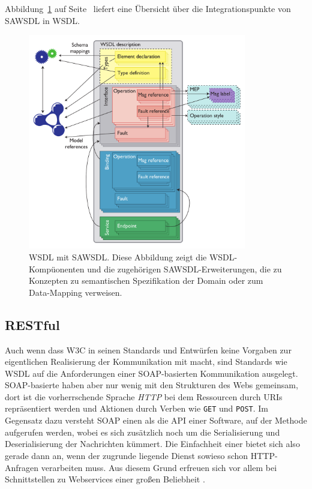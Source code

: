 Abbildung~\ref{f:sawsdl} auf Seite~\pageref{f:sawsdl} liefert eine Übersicht über die Integrationspunkte von \ac{SAWSDL} in \ac{WSDL}.

\begin{figure}[ht]
\centering
\parbox{0.85\textwidth}{
    \includegraphics[width=0.85\textwidth]{media/sawsdl.png}
    \caption{\ac{WSDL} mit \ac{SAWSDL}. Diese Abbildung zeigt die \ac{WSDL}-Kompüonenten und die zugehörigen \ac{SAWSDL}-Erweiterungen, die zu Konzepten zu semantischen Spezifikation der Domain oder zum Data-Mapping verweisen. \cite[S.61]{ky-sawsdl}
}
    \label{f:sawsdl}
}
\end{figure}

\subsection{RESTful \wss}

Auch wenn dass \ac{W3C} in seinen Standards und Entwürfen keine Vorgaben zur eigentlichen Realisierung der Kommunikation mit \wss macht, sind Standards wie \ac{WSDL} auf die Anforderungen einer \ac{SOAP}-basierten Kommunikation ausgelegt. \ac{SOAP}-basierte \ws haben aber nur wenig mit den Strukturen des Webs gemeinsam, dort ist die vorherrschende Sprache \emph{HTTP} bei dem Ressourcen durch URIs repräsentiert werden und Aktionen durch Verben wie \texttt{GET} und \texttt{POST}. Im Gegensatz dazu versteht \ac{SOAP} einen \ws als die \ac{API} einer Software, auf der Methode aufgerufen werden, wobei es sich zusätzlich noch um die Serialisierung und Deserialisierung der Nachrichten kümmert. Die Einfachheit einer \restapi bietet sich also gerade dann an, wenn der zugrunde liegende Dienst sowieso schon HTTP-Anfragen verarbeiten muss. Aus diesem Grund erfreuen sich \restapis vor allem bei Schnittstellen zu Webservices einer großen Beliebheit \cite[S.18]{xn-sss}.

